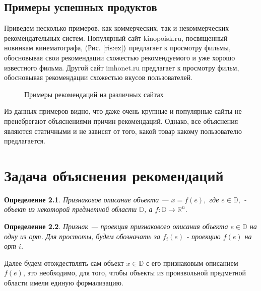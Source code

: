 \documentclass[12pt,a4paper]{report}
\begin{document}
\section{Примеры успешных продуктов}
Приведем несколько примеров, как коммерческих, так и некоммерческих рекомендательных систем.
Популярный сайт kinopoisk.ru, посвященный новинкам кинематографа,  (Рис. $\ref{ris:ex})$ предлагает к просмотру фильмы, обосновывая свои рекомендации схожестью рекомендуемого и уже хорошо известного фильма.
Другой сайт imhonet.ru предлагает к просмотру фильм, обосновывая рекомендации схожестью вкусов пользователей.
\begin{figure}[H]
\begin{minipage}[h]{0.49\linewidth}
\end{minipage}
\hfill
\begin{minipage}[h]{0.49\linewidth}
\end{minipage}
\caption{Примеры рекомендаций на различных сайтах}
\label{ris:ex}
\end{figure}

Из данных примеров видно, что даже очень крупные и популярные сайты не пренебрегают объяснениями причин рекомендаций. Однако, все объяснения являются статичными и не зависят от того, какой товар какому пользователю предлагается.


\chapter{Задача объяснения рекомендаций}
\newtheorem{Def}{Определение}
\begin{Def}
Признаковое описание объекта --- $x = f(e),$ где $e \in \mathbb{D},$ - объект из некоторой предметной области $\mathbb{D}$, а $f: \mathbb{D}  \to \mathbb{R}^n$.
\end{Def}

\begin{Def}
Признак --- проекция признакового описания объекта $e \in \mathbb{D}$ на одну из орт. Для простоты, будем обозначать за $f_i(e)$ - проекцию $f(e)$ на орт $i$.
\end{Def}

Далее будем отождествлять сам объект $x \in \mathbb{D}$ с его признаковым описанием $f(e)$, это необходимо, для того, чтобы объекты из произвольной предметной области имели единую формализацию.
\end{document}
